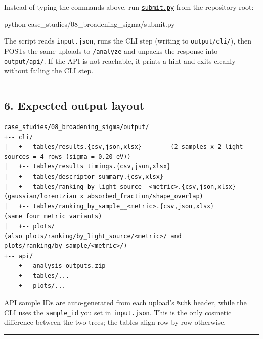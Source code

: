 \documentclass[
  11pt,
]{article}
\newenvironment{Shaded}{}{}
\newcommand{\ExtensionTok}[1]{#1}
\newcommand{\NormalTok}[1]{#1}
\begin{document}
Instead of typing the commands above, run
\href{https://github.com/pinarsyt/overlap-calculator/blob/main/case_studies/08_broadening_sigma/submit.py}{\texttt{submit.py}}
from the repository root:

\begin{Shaded}
\begin{Highlighting}[]
\ExtensionTok{python}\NormalTok{ case\_studies/08\_broadening\_sigma/submit.py}
\end{Highlighting}
\end{Shaded}

The script reads \texttt{input.json}, runs the CLI step (writing to
\texttt{output/cli/}), then POSTs the same uploads to \texttt{/analyze}
and unpacks the response into \texttt{output/api/}. If the API is not
reachable, it prints a hint and exits cleanly without failing the CLI
step.

\begin{center}\rule{0.5\linewidth}{0.5pt}\end{center}

\hypertarget{6-expected-output-layout}{
\subsection{6. Expected output layout}\label{6-expected-output-layout}}

\begin{verbatim}
case_studies/08_broadening_sigma/output/
+-- cli/
|   +-- tables/results.{csv,json,xlsx}        (2 samples x 2 light sources = 4 rows (sigma = 0.20 eV))
|   +-- tables/results_timings.{csv,json,xlsx}
|   +-- tables/descriptor_summary.{csv,xlsx}
|   +-- tables/ranking_by_light_source__<metric>.{csv,json,xlsx}   (gaussian/lorentzian x absorbed_fraction/shape_overlap)
|   +-- tables/ranking_by_sample__<metric>.{csv,json,xlsx}          (same four metric variants)
|   +-- plots/                                                      (also plots/ranking/by_light_source/<metric>/ and plots/ranking/by_sample/<metric>/)
+-- api/
    +-- analysis_outputs.zip
    +-- tables/...
    +-- plots/...
\end{verbatim}

API sample IDs are auto-generated from each upload's \texttt{\%chk}
header, while the CLI uses the \texttt{sample\_id} you set in
\texttt{input.json}. This is the only cosmetic difference between the
two trees; the tables align row by row otherwise.

\begin{center}\rule{0.5\linewidth}{0.5pt}\end{center}
\end{document}
